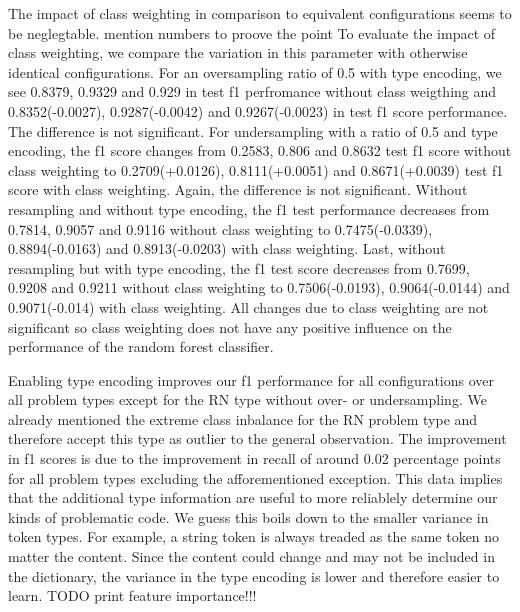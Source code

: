 The impact of class weighting in comparison to equivalent configurations seems to be neglegtable. 
mention numbers to proove the point
To evaluate the impact of class weighting, we compare the variation in this parameter with otherwise identical configurations.
For an oversampling ratio of 0.5 with type encoding, we see 0.8379, 0.9329 and 0.929 in test f1 perfromance without class weigthing and 0.8352(-0.0027), 0.9287(-0.0042) and 0.9267(-0.0023) in test f1 score performance. The difference is not significant.
For undersampling with a ratio of 0.5 and type encoding, the f1 score changes from 0.2583, 0.806 and 0.8632 test f1 score without class weighting to 0.2709(+0.0126), 0.8111(+0.0051) and 0.8671(+0.0039) test f1 score with class weighting. Again, the difference is not significant.
Without resampling and without type encoding, the f1 test performance decreases from 0.7814, 0.9057 and 0.9116 without class weighting to 0.7475(-0.0339), 0.8894(-0.0163) and 0.8913(-0.0203) with class weighting.
Last, without resampling but with type encoding, the f1 test score decreases from 0.7699, 0.9208 and 0.9211 without class weighting to 0.7506(-0.0193), 0.9064(-0.0144) and 0.9071(-0.014) with class weighting.
All changes due to class weighting are not significant so class weighting does not have any positive influence on the performance of the random forest classifier.

Enabling type encoding improves our f1 performance for all configurations over all problem types except for the RN type without over- or undersampling. We already mentioned the extreme class inbalance for the RN problem type and therefore accept this type as outlier to the general observation. The improvement in f1 scores is due to the improvement in recall of around 0.02 percentage points for all problem types excluding the afforementioned exception. This data implies that the additional type information are useful to more reliablely determine our kinds of problematic code. We guess this boils down to the smaller variance in token types. For example, a string token is always treaded as the same token no matter the content. Since the content could change and may not be included in the dictionary, the variance in the type encoding is lower and therefore easier to learn. TODO print feature importance!!!

